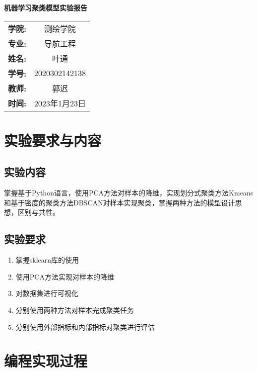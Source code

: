 \documentclass{ctexart}
\begin{document}
\newpage
\thispagestyle{empty}
    \begin{center}
        \Huge\textbf{机器学习聚类模型实验报告}
    \end{center}
\vspace*{\fill}

\begin{table}[h]
    \centering
    \Large
    \begin{tabular}{cc}
    \textbf{学院:} & 测绘学院 \\ \cline{2-2}
    \textbf{专业:} & 导航工程 \\ \cline{2-2}
    \textbf{姓名:} & 叶通 \\  \cline{2-2}
    \textbf{学号:} & 2020302142138 \\ \cline{2-2}
    \textbf{教师:} & 郭迟 \\ \cline{2-2}
    \textbf{时间:} & 2023年1月23日 \\ \cline{2-2}
    \end{tabular}
\end{table}

\newpage
{}
\setcounter{page}{1}
\tableofcontents

\newpage
\setcounter{page}{1}

\section{实验要求与内容}
\subsection{实验内容}
掌握基于Python语言，使用PCA方法对样本的降维，实现划分式聚类方法Kmeans和基于密度的聚类方法DBSCAN对样本实现聚类，掌握两种方法的模型设计思想，区别与共性。
\subsection{实验要求}
\begin{enumerate}[(1)]
\item 掌握sklearn库的使用
\item 使用PCA方法实现对样本的降维
\item 对数据集进行可视化
\item 分别使用两种方法对样本完成聚类任务
\item 分别使用外部指标和内部指标对聚类进行评估
\end{enumerate}

\section{编程实现过程}
\end{document}
